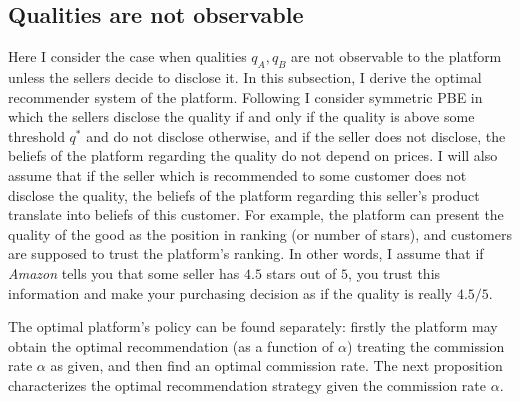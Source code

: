 \documentclass[a4paper]{article}
\begin{document}
	\subsection{Qualities are not observable}
Here I consider the case when qualities $q_A, q_B$ are not observable to the platform unless the sellers decide to disclose it. In this subsection, I derive the optimal recommender system of the platform. Following \cite{levin2009quality} I consider symmetric PBE in which the sellers disclose the quality if and only if the quality is above some threshold $q^*$ and do not disclose otherwise, and if the seller does not disclose, the beliefs of the platform regarding the quality do not depend on prices. I will also assume that if the seller which is recommended to some customer does not disclose the quality, the beliefs of the platform regarding this seller's product translate into beliefs of this customer. For example, the platform can present the quality of the good as the position in ranking (or number of stars), and customers are supposed to trust the platform's ranking. In other words, I assume that if \textit{Amazon} tells you that some seller has $4.5$ stars out of $5$, you trust this information and make your purchasing decision as if the quality is really $4.5/5$.



The optimal platform's policy can be found separately: firstly the platform may obtain the optimal recommendation (as a function of $\alpha$) treating the commission rate $\alpha$ as given, and then find an optimal commission rate. The next proposition characterizes the optimal recommendation strategy given the commission rate $\alpha$.
\end{document}
